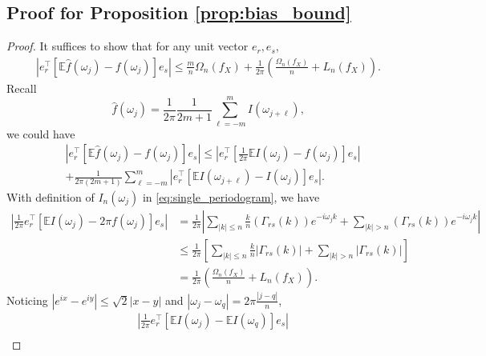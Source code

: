 \subsection{Proof for Proposition \ref{prop:bias_bound}}
\begin{proof}
It suffices to show that for any unit vector $e_r,e_s$, 
\begin{equation}
\begin{aligned}
\left|e_r^\top \left[\mathbb{E}\hat{f}(\omega_j) - f(\omega_j)\right]e_s\right| \le \frac{m}{n}\Omega_n(f_X) + \frac{1}{2\pi}\left(\frac{\Omega_n(f_X)}{n}+L_n(f_X)\right). 
\end{aligned}
\end{equation}
Recall 
\begin{equation}
\hat{f}(\omega_j) = \frac{1}{2\pi}\frac{1}{2m+1} \sum_{\ell =-m}^m I(\omega_{j+\ell}), 
\end{equation}
we could have 
\begin{equation}
\label{eq:mul_dev}
\begin{aligned}
&\left|e_r^\top \left[\mathbb{E}\hat{f}(\omega_j) - f(\omega_j)\right]e_s\right| 
\le \left|e_r^\top \left[\frac{1}{2\pi}\mathbb{E}I(\omega_j) - f(\omega_j)\right]e_s\right|\\
&+\frac{1}{2\pi(2m+1)} \sum_{\ell = -m}^m |e_r^\top\left[\mathbb{E}I(\omega_{j+\ell}) - I(\omega_{j})\right]e_s|.
\end{aligned}
\end{equation}
With definition of $I_n(\omega_j)$ in \eqref{eq:single_periodogram}, we have 
\begin{equation}
\label{eq:mul_dev1}
\begin{aligned}
\left|\frac{1}{2\pi} e_r^\top \left[\mathbb{E} I(\omega_j) - 2\pi f(\omega_j)\right]e_s\right| &= \frac{1}{2\pi}\left|\sum_{|k|\le n} \frac{k}{n}  (\Gamma_{rs}(k)) e^{-i\omega_j k}+\sum_{|k|>n} (\Gamma_{rs}(k)) e^{-i\omega_jk}\right|\\
&\le \frac{1}{2\pi} \left [\sum_{|k|\le n} \frac{k}{n}  |\Gamma_{rs}(k)|+ \sum_{|k|>n} |\Gamma_{rs}(k)|\right]\\
&= \frac{1}{2\pi}\left(\frac{\Omega_n(f_X)}{n} + L_n(f_X)\right).
\end{aligned}
\end{equation}
Noticing $|e^{ix} - e^{iy}|\le \sqrt{2} |x-y|$ and $|\omega_j-\omega_q| = 2\pi \frac{|j-q|}{n}$, 
\begin{equation}
\label{eq:mul_dev2}
\begin{aligned}
&\left|\frac{1}{2\pi} e_r^\top \left[\mathbb{E} I(\omega_j) - \mathbb{E} I(\omega_q) \right]e_s\right| \\

\end{aligned}
\end{equation}
\end{proof}
